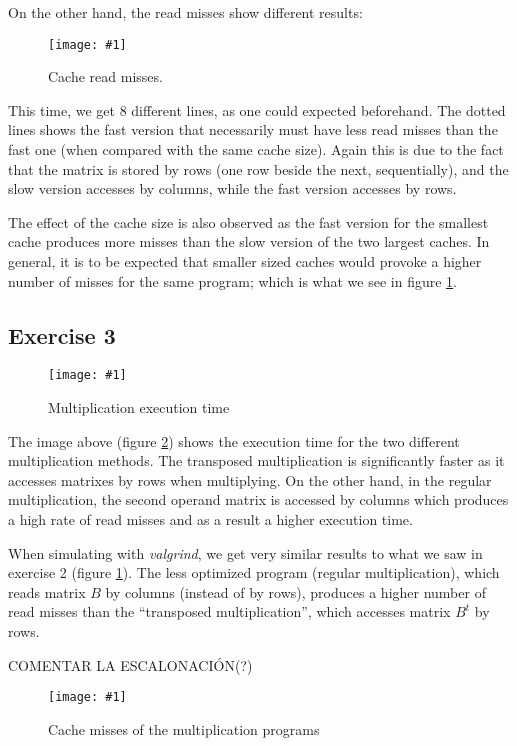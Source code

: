\documentclass{article}
\newcommand{\myFigure}[4]{%
    \begin{figure}[!ht]
        \texttt{[image: \#1]}
        \centering
        \caption{#2}
        \label{#3}
    \end{figure}
}
\begin{document}
On the other hand, the read misses show different results:

\myFigure{../material_P3/out2/mv_att1/cache_lectura.png}{Cache read misses.}{cache_lectura}{0.4}

This time, we get 8 different lines, as one could expected beforehand. The dotted lines shows the fast version that necessarily must have less read misses than the fast one (when compared with the same cache size). Again this is due to the fact that the matrix is stored by rows (one row beside the next, sequentially), and the slow version accesses by columns, while the fast version accesses by rows.

The effect of the cache size is also observed as the fast version for the smallest cache produces more misses than the slow version of the two largest caches. In general, it is to be expected that smaller sized caches would provoke a higher number of misses for the same program; which is what we see in figure \ref{cache_lectura}.




\subsection*{Exercise 3}

\myFigure{../material_P3/out3/mv_att2/mult_time.png}{Multiplication execution time}{mult_time}{0.4}

The image above (figure \ref{mult_time}) shows the execution time for the two different multiplication methods. The transposed multiplication is significantly faster as it accesses matrixes by rows when multiplying. On the other hand, in the regular multiplication, the second operand matrix is accessed by columns which produces a high rate of read misses and as a result a higher execution time.

\pagebreak

When simulating with \emph{valgrind}, we get very similar results to what we saw in exercise 2 (figure \ref{cache_lectura}). The less optimized program (regular multiplication), which reads matrix $B$ by columns (instead of by rows), produces a higher number of read misses than the ``transposed multiplication'', which accesses matrix $B^t$ by rows.

COMENTAR LA ESCALONACIÓN(?)

\myFigure{../material_P3/out3/mv_att2/mult_cache.png}{Cache misses of the multiplication programs}{mult_misses}{0.45}
\end{document}
